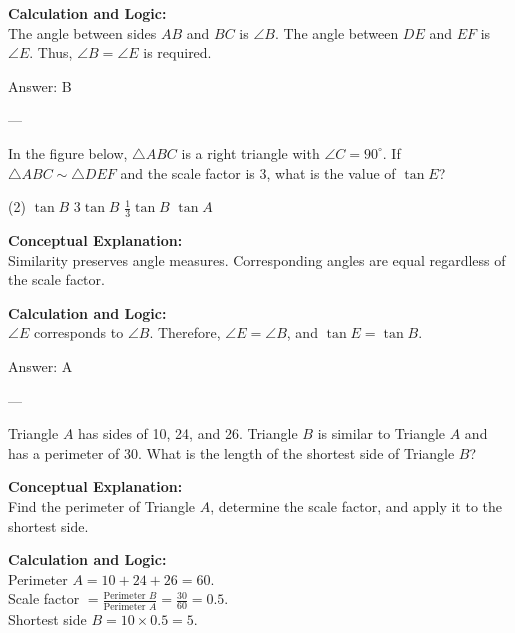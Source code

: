 \documentclass[11pt,paper=a4,answers]{exam}
\begin{document}
\begin{questions}
\begin{solution}
\vspace{10pt}
\textbf{Calculation and Logic:} \\
The angle between sides $AB$ and $BC$ is $\angle B$. The angle between $DE$ and $EF$ is $\angle E$. Thus, $\angle B = \angle E$ is required.

\vspace{15pt}
Answer: \colorbox{yellow!100}{B}
\end{solution}

---

\question
In the figure below, $\triangle ABC$ is a right triangle with $\angle C = 90^\circ$. If $\triangle ABC \sim \triangle DEF$ and the scale factor is 3, what is the value of $\tan E$?
\begin{tasks}(2)
    \task $\tan B$
    \task $3 \tan B$
    \task $\frac{1}{3} \tan B$
    \task $\tan A$
\end{tasks}

\begin{solution}
\textbf{Conceptual Explanation:} \\
Similarity preserves angle measures. Corresponding angles are equal regardless of the scale factor.

\vspace{10pt}
\textbf{Calculation and Logic:} \\
$\angle E$ corresponds to $\angle B$. Therefore, $\angle E = \angle B$, and $\tan E = \tan B$.

\vspace{15pt}
Answer: \colorbox{yellow!100}{A}
\end{solution}

---

\question
Triangle $A$ has sides of 10, 24, and 26. Triangle $B$ is similar to Triangle $A$ and has a perimeter of 30. What is the length of the shortest side of Triangle $B$?

\begin{solution}
\textbf{Conceptual Explanation:} \\
Find the perimeter of Triangle $A$, determine the scale factor, and apply it to the shortest side.

\vspace{10pt}
\textbf{Calculation and Logic:} \\
Perimeter $A = 10 + 24 + 26 = 60$. \\
Scale factor $= \frac{\text{Perimeter } B}{\text{Perimeter } A} = \frac{30}{60} = 0.5$. \\
Shortest side $B = 10 \times 0.5 = 5$.


\end{solution}
\end{questions}
\end{document}
